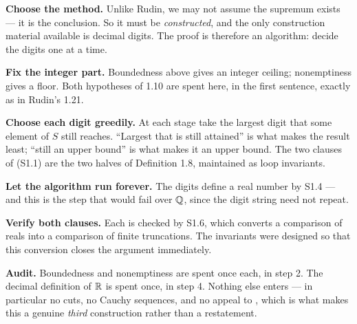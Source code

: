 \begin{proofwalk}
  \item \textbf{Choose the method.} Unlike Rudin, we may not assume the
        supremum exists --- it is the conclusion. So it must be
        \emph{constructed}, and the only construction material available is
        decimal digits. The proof is therefore an algorithm: decide the
        digits one at a time.
  \item \textbf{Fix the integer part.} Boundedness above gives an integer
        ceiling; nonemptiness gives a floor. Both hypotheses of 1.10 are
        spent here, in the first sentence, exactly as in Rudin's 1.21.
  \item \textbf{Choose each digit greedily.} At each stage take the largest
        digit that some element of $S$ still reaches. ``Largest that is still
        attained'' is what makes the result least; ``still an upper bound''
        is what makes it an upper bound. The two clauses of (S1.1) are the
        two halves of Definition 1.8, maintained as loop invariants.
  \item \textbf{Let the algorithm run forever.} The digits define a real
        number by S1.4 --- and this is the step that would fail over $\mathbb{Q}$,
        since the digit string need not repeat.
  \item \textbf{Verify both clauses.} Each is checked by S1.6, which converts
        a comparison of reals into a comparison of finite truncations. The
        invariants were designed so that this conversion closes the argument
        immediately.
  \item \textbf{Audit.} Boundedness and nonemptiness are spent once each, in
        step 2. The decimal definition of $\mathbb{R}$ is spent once, in step 4.
        Nothing else enters --- in particular no cuts, no Cauchy sequences,
        and no appeal to \lub{}, which is what makes this a genuine
        \emph{third} construction rather than a restatement.
\end{proofwalk}

